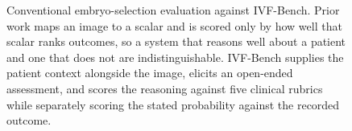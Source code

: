 \begin{figure}[H]
\caption{Conventional embryo-selection evaluation against IVF-Bench. Prior work
maps an image to a scalar and is scored only by how well that scalar ranks
outcomes, so a system that reasons well about a patient and one that does not are
indistinguishable. IVF-Bench supplies the patient context alongside the image,
elicits an open-ended assessment, and scores the reasoning against five clinical
rubrics while separately scoring the stated probability against the recorded
outcome.}
\label{fig:pipeline}
\end{figure}

